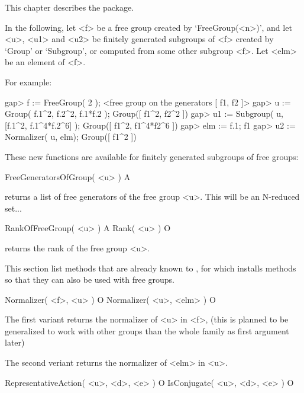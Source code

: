 

This chapter  describes  the  {\FGA}  package.

In the following, let <f> be a free group created by `FreeGroup(<n>)',
and let <u>, <u1> and <u2> be finitely generated subgroups of <f>
created by `Group' or `Subgroup', or computed from some other subgroup
<f>.  Let <elm> be an element of <f>.

For example:

\beginexample
gap> f := FreeGroup( 2 );                                             
<free group on the generators [ f1, f2 ]>
gap> u := Group( f.1^2, f.2^2, f.1*f.2 );
Group([ f1^2, f2^2 ])
gap> u1 := Subgroup( u, [f.1^2, f.1^4*f.2^6] );
Group([ f1^2, f1^4*f2^6 ])
gap> elm := f.1;
f1
gap> u2 := Normalizer( u, elm);
Group([ f1^2 ])
\endexample


These new functions are available for finitely generated subgroups of
free groups:

\>FreeGeneratorsOfGroup( <u> ) A

returns a list of free generators of the free group <u>.
This will be an N-reduced set...

\>RankOfFreeGroup( <u> ) A
\>Rank( <u> ) O

returns the rank of the free group <u>.


This section list methods that are already known to {\GAP}, for which
{\FGA} installs methods so that they can also be used with free groups.

\>Normalizer( <f>, <u> ) O
\>Normalizer( <u>, <elm> ) O

The first variant returns the normalizer of <u> in <f>, (this is planned
to be generalized to work with other groups than the whole family as
first argument later)

The second veriant returns the normalizer of <elm> in <u>.

\>RepresentativeAction( <u>, <d>, <e> ) O
\>IsConjugate( <u>, <d>, <e> ) O

